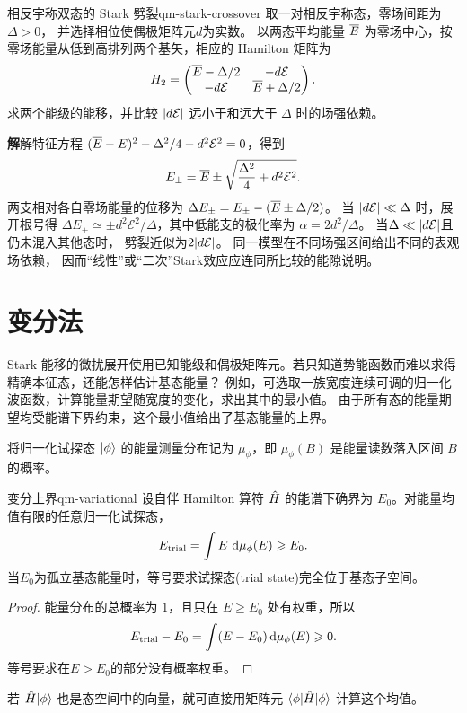 \begin{example}{相反宇称双态的 Stark 劈裂}{qm-stark-crossover}
    取一对相反宇称态，零场间距为$\Delta > 0$，
    并选择相位使偶极矩阵元$d$为实数。
    以两态平均能量 $\overline{E}$ 为零场中心，按零场能量从低到高排列两个基矢，相应的 Hamilton 矩阵为
    \begin{equation}
        H_2 = \begin{pmatrix}
                \overline{E} - \Delta/2 & -d\mathcal E\\
                -d\mathcal E & \overline{E} + \Delta/2
              \end{pmatrix}.
    \end{equation}
    求两个能级的能移，并比较 $\lvert d\mathcal E\rvert$ 远小于和远大于 $\Delta$ 时的场强依赖。

    \par\smallskip\textbf{解}\quad 解特征方程 $(\overline{E} - E)^2 - \Delta^2/4 - d^2\mathcal E^2 = 0$，得到
    \begin{equation}
        E_\pm = \overline{E} \pm
            \sqrt{\frac{\Delta^2}{4} + d^2\mathcal E^2}.
    \end{equation}
    两支相对各自零场能量的位移为 $\Delta E_\pm = E_\pm - (\overline{E} \pm \Delta/2)$。
    当 $\lvert d\mathcal E\rvert \ll \Delta$ 时，展开根号得 $\Delta E_\pm \simeq \pm d^2\mathcal E^2/\Delta$，其中低能支的极化率为 $\alpha = 2d^2/\Delta$。
    当$\Delta \ll \lvert d\mathcal E\rvert$且仍未混入其他态时，
    劈裂近似为$2\lvert d\mathcal E\rvert$。
    同一模型在不同场强区间给出不同的表观场依赖，
    因而“线性”或“二次”Stark效应应连同所比较的能隙说明。
\end{example}

\section{变分法}

Stark 能移的微扰展开使用已知能级和偶极矩阵元。若只知道势能函数而难以求得精确本征态，还能怎样估计基态能量？
例如，可选取一族宽度连续可调的归一化波函数，计算能量期望随宽度的变化，求出其中的最小值。
由于所有态的能量期望均受能谱下界约束，这个最小值给出了基态能量的上界。

将归一化试探态 $\lvert\phi\rangle$ 的能量测量分布记为 $\mu_\phi$，即 $\mu_\phi(B)$ 是能量读数落入区间 $B$ 的概率。
\begin{theorem}[unbreakable]{变分上界}{qm-variational}
    设自伴 Hamilton 算符 $\hat{H}$ 的能谱下确界为 $E_0$。对能量均值有限的任意归一化试探态，
    \begin{equation}
        E_{\mathrm{trial}} = \int E\,\mathop{}\!\mathrm{d}\mu_\phi(E) \geqslant E_0 .
    \end{equation}
    当$E_0$为孤立基态能量时，等号要求试探态(trial state)完全位于基态子空间。
\end{theorem}
\begin{proof}
    能量分布的总概率为 $1$，且只在 $E \ge E_0$ 处有权重，所以
    \begin{equation}
        E_{\mathrm{trial}} - E_0
        = \int(E - E_0)\mathop{}\!\mathrm{d}\mu_\phi(E) \geqslant 0.
    \end{equation}
    等号要求在$E > E_0$的部分没有概率权重。
\end{proof}
若 $\hat{H}\lvert\phi\rangle$ 也是态空间中的向量，就可直接用矩阵元 $\langle\phi\vert\hat{H}\vert\phi\rangle$ 计算这个均值。

